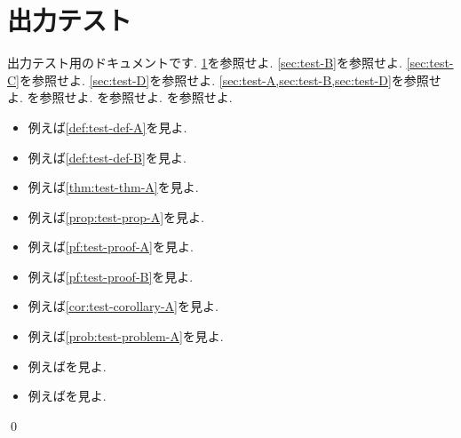 \documentclass[uplatex, dvipdfmx, a4paper, 12pt, class=jsbook, crop=false]{standalone}
\begin{document}
\section{出力テスト}
\label{sec:test-A}

出力テスト用のドキュメントです.
\cref{sec:test-A}を参照せよ.
\cref{sec:test-B}を参照せよ.
\cref{sec:test-C}を参照せよ.
\cref{sec:test-D}を参照せよ.
\cref{sec:test-A,sec:test-B,sec:test-D}を参照せよ. %
\cite{Engelking1995TD}を参照せよ.
\cite{Morita1981ja}を参照せよ.
\cite{KodamaNagami1974ja}を参照せよ.

\begin{itemize}
	\item 例えば\cref{def:test-def-A}を見よ.
	\item 例えば\cref{def:test-def-B}を見よ.
	\item 例えば\cref{thm:test-thm-A}を見よ.
	\item 例えば\cref{prop:test-prop-A}を見よ.
	\item 例えば\cref{pf:test-proof-A}を見よ.
	\item 例えば\cref{pf:test-proof-B}を見よ.
	\item 例えば\cref{cor:test-corollary-A}を見よ.
	\item 例えば\cref{prob:test-problem-A}を見よ.
	\item 例えば\cite{KodamaNagami1974ja}を見よ.
	\item 例えば\cite{Morita1981ja}を見よ.
\end{itemize}

\begin{definition}
	\label{def:test-def-A}
	\lipsum[1][1-4]
\end{definition}

\begin{definition}[テスト定義B]
	\label{def:test-def-B}
	\lipsum[1][2]
\end{definition}

\begin{theorem}[テスト定理A]
	\label{thm:test-thm-A}
	\lipsum[1][2]
\end{theorem}

\begin{corollary}
	\label{cor:test-corollary-A}
	\lipsum[1][2]
	\qed
\end{corollary}

\begin{corollary}
	\label{cor:test-corollary-B}
	\lipsum[1][2]
\end{corollary}
\end{document}
